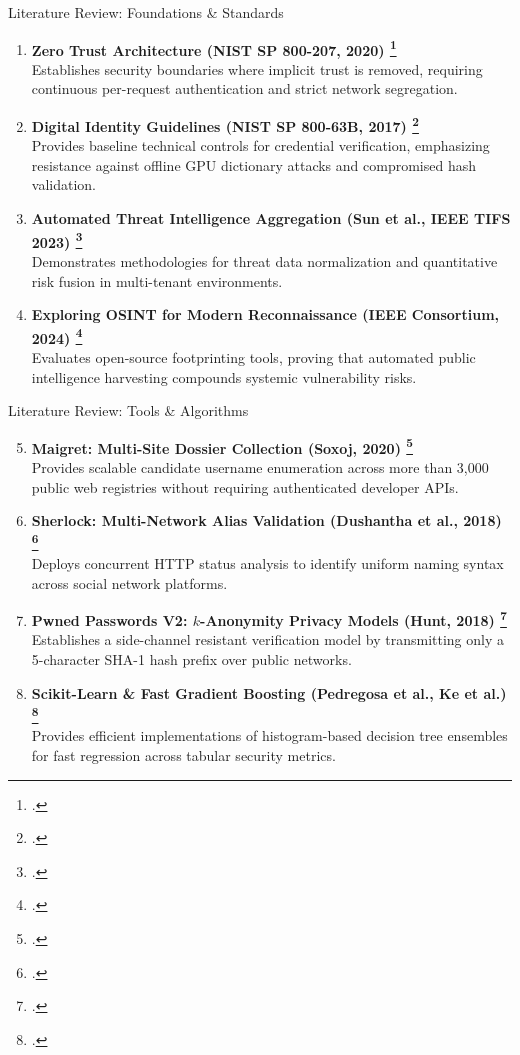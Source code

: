 \documentclass[aspectratio=169,10pt]{beamer}
\begin{document}
\begin{frame}{Literature Review: Foundations \& Standards}
  \footnotesize
  \begin{enumerate}\setlength{\itemsep}{0.25cm}
    \item \textbf{Zero Trust Architecture (NIST SP 800-207, 2020) \footcite{nist2020}}\\
      Establishes security boundaries where implicit trust is removed, requiring continuous per-request authentication and strict network segregation.
    \item \textbf{Digital Identity Guidelines (NIST SP 800-63B, 2017) \footcite{NIST_SP_800_63B}}\\
      Provides baseline technical controls for credential verification, emphasizing resistance against offline GPU dictionary attacks and compromised hash validation.
    \item \textbf{Automated Threat Intelligence Aggregation (Sun et al., IEEE TIFS 2023) \footcite{sun2023}}\\
      Demonstrates methodologies for threat data normalization and quantitative risk fusion in multi-tenant environments.
    \item \textbf{Exploring OSINT for Modern Reconnaissance (IEEE Consortium, 2024) \footcite{ieee2024osintrecon}}\\
      Evaluates open-source footprinting tools, proving that automated public intelligence harvesting compounds systemic vulnerability risks.
  \end{enumerate}
\end{frame}

\begin{frame}{Literature Review: Tools \& Algorithms}
  \footnotesize
  \begin{enumerate}\setcounter{enumi}{4}\setlength{\itemsep}{0.25cm}
    \item \textbf{Maigret: Multi-Site Dossier Collection (Soxoj, 2020) \footcite{soxoj2020maigret}}\\
      Provides scalable candidate username enumeration across more than 3,000 public web registries without requiring authenticated developer APIs.
    \item \textbf{Sherlock: Multi-Network Alias Validation (Dushantha et al., 2018) \footcite{dushantha2018sherlock}}\\
      Deploys concurrent HTTP status analysis to identify uniform naming syntax across social network platforms.
    \item \textbf{Pwned Passwords V2: $k$-Anonymity Privacy Models (Hunt, 2018) \footcite{hunt2018}}\\
      Establishes a side-channel resistant verification model by transmitting only a 5-character SHA-1 hash prefix over public networks.
    \item \textbf{Scikit-Learn \& Fast Gradient Boosting (Pedregosa et al., Ke et al.) \footcite{pedregosa2011, ke2017}}\\
      Provides efficient implementations of histogram-based decision tree ensembles for fast regression across tabular security metrics.
  \end{enumerate}
\end{frame}
\end{document}
